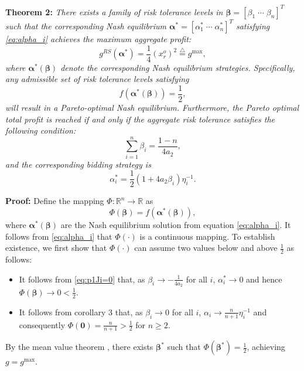 \documentclass[conference]{IEEEtran}
\begin{document}
\noindent\textbf{Theorem 2:} {\it There exists a family of risk tolerance levels in  $\boldsymbol{\beta}=[\beta_1 \; \cdots \; \beta_n]^T$ such that the corresponding Nash equilibrium  $\boldsymbol{\alpha}^*=[\alpha_1^* \; \cdots \; \alpha_n^*]^T$ satisfying \eqref{eq:alpha_i} achieves the maximum aggregate profit:
\[
g^{RS}(\boldsymbol{\alpha}^*)  = \frac{1}{4}(x_r^o)^2 \stackrel{\triangle}{=} g^{\max},
\]
where $\boldsymbol{\alpha}^*(\boldsymbol{\beta})$ denote the corresponding Nash equilibrium strategies. 
Specifically, any admissible set of risk tolerance levels satisfying
\begin{equation}
f(\boldsymbol{\alpha}^*(\boldsymbol{\beta})) = \frac{1}{2}, \label{eq:pareto_condition}
\end{equation}
will result in a Pareto-optimal Nash equilibrium. Furthermore, the Pareto optimal total profit is reached if and only if the aggregate risk tolerance satisfies the following condition:
\begin{equation}
\sum_{i=1}^n \beta_i = \frac{1-n}{4a_2},
\label{eq:beta_sum_condition}
\end{equation}
and the corresponding bidding strategy is 
\begin{equation}
    \alpha_i^* = \frac{1}{2}(1+4a_2\beta_i)\eta_i^{-1}. \label{eq:alpha_optimal}
\end{equation}}

\noindent\textbf{Proof:} Define the mapping $\Phi: \mathbb{R}^n \to \mathbb{R}$ as \[ \Phi(\boldsymbol{\beta}) = f(\boldsymbol{\alpha}^*(\boldsymbol{\beta})), \] 
where $\boldsymbol{\alpha}^*(\boldsymbol{\beta})$ are the Nash equilibrium solution from equation \eqref{eq:alpha_i}. It follows from  \eqref{eq:alpha_i} that $\Phi(\cdot)$ is a continuous mapping. To establish existence, we first show that $\Phi(\cdot)$ can assume two values below and above $\frac{1}{2}$ as follows:
\begin{itemize}
\item It follows from \eqref{eq:p1Ji=0} that, as $\beta_i \to -\frac{1}{4a_2}$ for all $i$, $\alpha_i^* \to 0$ and hence $\Phi(\boldsymbol{\beta}) \rightarrow 0 < \frac{1}{2}$. 
\item It follows from corollary 3 that, as $\beta_i \to 0$ for all $i$, $\alpha_i \to \tfrac{n}{n+1}\eta_i^{-1}$ and consequently $\Phi(\boldsymbol{0}) = \tfrac{n}{n+1} > \frac{1}{2}$ for $n \geq 2$.
\end{itemize}
By the mean value theorem \cite{rudin}, there exists $\boldsymbol{\beta}^*$ such that $\Phi(\boldsymbol{\beta}^*) = \frac{1}{2}$, achieving $g = g^{\max}$. 
\end{document}
